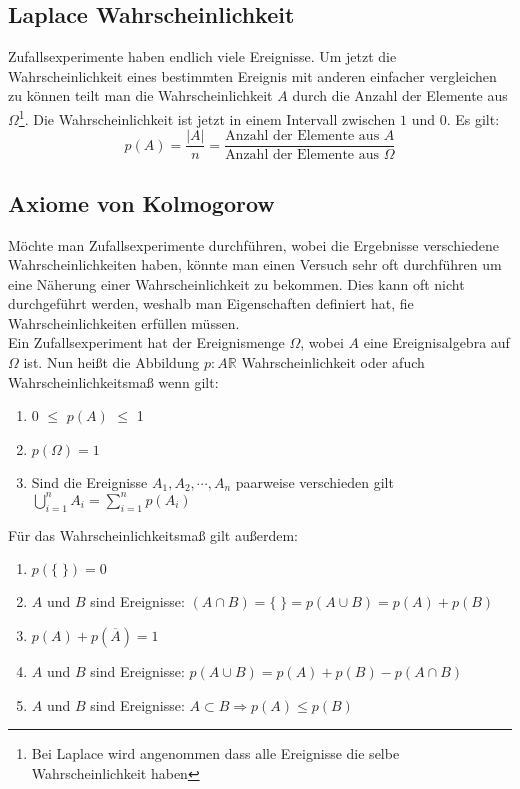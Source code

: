 \documentclass[a4paper]{scrartcl}
\begin{document}
        \subsection{Laplace Wahrscheinlichkeit}
            Zufallsexperimente haben endlich viele Ereignisse. Um jetzt die Wahrscheinlichkeit eines bestimmten Ereignis mit anderen einfacher vergleichen zu können
            teilt man die Wahrscheinlichkeit \(A\) durch die Anzahl der Elemente aus \(\Omega\)\footnote{Bei Laplace wird angenommen dass alle Ereignisse die selbe Wahrscheinlichkeit haben}.
            Die Wahrscheinlichkeit ist jetzt in einem Intervall zwischen \(1\) und \(0\). Es gilt:
            \begin{equation*}
                p(A) = \frac{|A|}{n} = \frac{\text{Anzahl der Elemente aus }A}{\text{Anzahl der Elemente aus } \Omega}
            \end{equation*}
        \subsection{Axiome von Kolmogorow}
            Möchte man Zufallsexperimente durchführen, wobei die Ergebnisse verschiedene Wahrscheinlichkeiten haben, könnte man einen Versuch sehr oft durchführen um eine Näherung 
            einer Wahrscheinlichkeit zu bekommen. Dies kann oft nicht durchgeführt werden, weshalb man Eigenschaften definiert hat, fie Wahrscheinlichkeiten erfüllen müssen. \\
            Ein Zufallsexperiment hat der Ereignismenge \(\Omega\), wobei  \(A\) eine Ereignisalgebra auf \(\Omega\) ist. Nun heißt die Abbildung \(p: A \mathbb{R} \) Wahrscheinlichkeit oder
            afuch Wahrscheinlichkeitsmaß wenn gilt:
            \begin{enumerate}
                \item 0 \(\le\) \(p(A)\) \(\le\) 1
                \item \(p(\Omega) = 1\)
                \item Sind die Ereignisse \(A_1,A_2,\cdots,A_n\) paarweise verschieden gilt \(\bigcup\limits_{i=1}^{n} A_i = \sum\limits_{i=1}^n p(A_i) \)
            \end{enumerate} 
            Für das Wahrscheinlichkeitsmaß gilt außerdem: 
            \begin{enumerate}[label=\alph*)]
                \item \(p(\{ \; \}) = 0\)
                \item \(A\) und \(B\) sind Ereignisse: \((A \cap B) = \{ \; \} = p( A \cup B) = p(A) + p(B)\)
                \item \(p(A) + p(\overline{A}) = 1\)
                \item \(A\) und \(B\) sind Ereignisse: \(p(A \cup B) = p(A) + p(B) - p(A \cap B)\)
                \item \(A\) und \(B\) sind Ereignisse: \(A \subset B \Rightarrow p(A) \le p(B)\)
            \end{enumerate}
\end{document}
